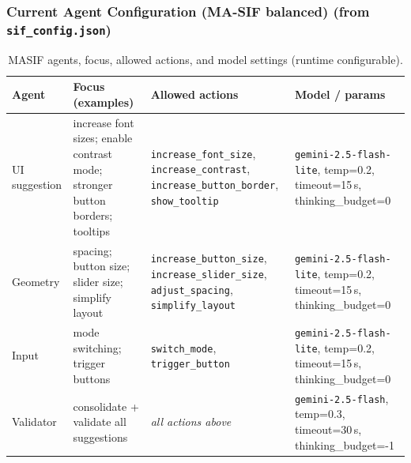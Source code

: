 \subsubsection*{Current Agent Configuration (MA-SIF balanced) (from \texttt{sif\_config.json})}
\begin{table}[H]
\centering
\begin{tabular}{p{2.1cm}p{4cm}p{4cm}p{4cm}}
\toprule
\textbf{Agent} & \textbf{Focus (examples)} & \textbf{Allowed actions} & \textbf{Model / params} \\
\midrule
UI suggestion & increase font sizes; enable contrast mode; stronger button borders; tooltips & \texttt{increase\_font\_size}, \texttt{increase\_contrast}, \texttt{increase\_button\_border}, \texttt{show\_tooltip} & \texttt{gemini-2.5-flash-lite}, temp{=}0.2, timeout{=}15\,s, thinking\_budget=0 \\
Geometry & spacing; button size; slider size; simplify layout & \texttt{increase\_button\_size}, \texttt{increase\_slider\_size}, \texttt{adjust\_spacing}, \texttt{simplify\_layout} & \texttt{gemini-2.5-flash-lite}, temp{=}0.2, timeout{=}15\,s, thinking\_budget=0 \\
Input & mode switching; trigger buttons & \texttt{switch\_mode}, \texttt{trigger\_button} & \texttt{gemini-2.5-flash-lite}, temp{=}0.2, timeout{=}15\,s, thinking\_budget=0 \\
Validator & consolidate + validate all suggestions & \emph{all actions above} & \texttt{gemini-2.5-flash}, temp{=}0.3, timeout{=}30\,s, thinking\_budget=-1 \\
\bottomrule
\end{tabular}
\caption{MA\textendash SIF agents, focus, allowed actions, and model settings (runtime configurable).}
\label{fig:current-agent-configuration}
\end{table}

